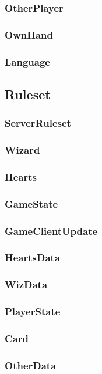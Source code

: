\documentclass{article}
\begin{document}
\subsubsection{OtherPlayer}
\subsubsection{OwnHand}
\subsubsection{Language}
\newpage

\subsection{Ruleset}
\subsubsection{ServerRuleset}
\subsubsection{Wizard}
\subsubsection{Hearts}
\subsubsection{GameState}
\subsubsection{GameClientUpdate}
\subsubsection{HeartsData}
\subsubsection{WizData}
\subsubsection{PlayerState}
\subsubsection{Card}
\subsubsection{OtherData}
\end{document}
